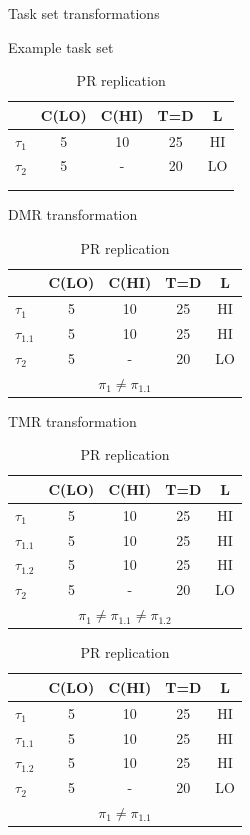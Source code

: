\documentclass[conference]{IEEEtran}
\begin{document}
	
\begin{table}
\centering
\caption{Task set transformations}
\label{t:transform}
	\begin{subtable}{0.3\textwidth}
		\caption{Example task set}
		\begin{tabular}{@{}l|cccc@{}}
		\toprule
		& C(LO) & C(HI) & T=D & L 	 \\\bottomrule
		$\tau_1$ & 5 & 10 & 25 & HI  \\
		$\tau_2$ & 5 & - & 20 & LO  \\
		\multicolumn{5}{c}{ } \\
		\multicolumn{5}{c}{ } \\
		\end{tabular}
	\end{subtable} 
	\begin{subtable}{0.3\textwidth}
		\caption{DMR transformation}
		\begin{tabular}{@{}l|cccc@{}}
		\toprule
				& C(LO) & C(HI) & T=D & L	 \\\bottomrule
		$\tau_1$ & 5 & 10 & 25 & HI  \\
		$\tau_{1.1}$ & 5 & 10 & 25 & HI  \\
		$\tau_2$ & 5 & - & 20 & LO  \\
		\multicolumn{5}{c}{$\pi_1 \ne \pi_{1.1}$}
		\end{tabular}
	\end{subtable}
	\begin{subtable}{0.3\textwidth}
		\caption{TMR transformation}
		\begin{tabular}{@{}l|cccc@{}}
		\toprule
				& C(LO) & C(HI) & T=D & L	 \\\bottomrule
		$\tau_1$ & 5 & 10 & 25 & HI  \\
		$\tau_{1.1}$ & 5 & 10 & 25 & HI  \\
		$\tau_{1.2}$ & 5 & 10 & 25 & HI  \\
		$\tau_2$ & 5 & - & 20 & LO  \\
		\multicolumn{5}{c}{$\pi_1 \ne \pi_{1.1} \ne \pi_{1.2}$}
		\end{tabular}
	\end{subtable} 
	\begin{subtable}{0.3\textwidth}
		\caption{PR replication}
		\begin{tabular}{@{}l|cccc@{}}
		\toprule
		& C(LO) & C(HI) & T=D & L	 \\\bottomrule
		$\tau_1$ & 5 & 10 & 25 & HI  \\
		$\tau_{1.1}$ & 5 & 10 & 25 & HI  \\
		$\tau_{1.2}$ & 5 & 10 & 25 & HI  \\
		$\tau_2$ & 5 & - & 20 & LO  \\
		\multicolumn{5}{c}{$\pi_1 \ne \pi_{1.1}$}
		\end{tabular}
	\end{subtable}
\end{table}
\end{document}
